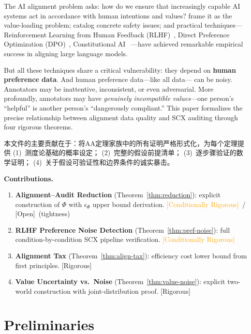 \documentclass[12pt,a4paper]{article}
\newcommand{\rigorous}{\textcolor{green!50!black}{\small\textsf{[Rigorous]}}}
\newcommand{\conditionallyrigorous}{\textcolor{orange}{\small\textsf{[Conditionally Rigorous]}}}
\newcommand{\openquest}{\textcolor{red!70!black}{\small\textsf{[Open]}}}
\begin{document}
The AI alignment problem asks: how do we ensure that increasingly capable AI
systems act in accordance with human intentions and values?
\citet{russell2019human} frame it as the value-loading problem;
\citet{amodei2016concrete} catalog concrete safety issues; and practical
techniques---Reinforcement Learning from Human Feedback
(RLHF)~\citep{christiano2017deep}, Direct Preference Optimization
(DPO)~\citep{rafailov2024direct}, Constitutional AI~\citep{bai2022constitutional}
---have achieved remarkable empirical success in aligning large language models.

But all these techniques share a critical vulnerability: they depend on
\textbf{human preference data}.  And human preference data---like all data---
can be noisy.  Annotators may be inattentive, inconsistent, or even
adversarial.  More profoundly, annotators may have \emph{genuinely
incompatible values}---one person's ``helpful'' is another person's
``dangerously compliant.''  This paper formalizes the precise relationship
between alignment data quality and SCX auditing through four rigorous theorems.

本文件的主要贡献在于：将AA定理家族中的所有证明严格形式化，为每个定理提供
(1)~测度论基础的概率设定； (2)~完整的假设前提清单；
(3)~逐步骤验证的数学证明； (4)~关于假设可验证性和边界条件的诚实暴击。

\medskip\noindent
\textbf{Contributions.}
\begin{enumerate}[label=(\arabic*)]
    \item \textbf{Alignment--Audit Reduction} (Theorem~\ref{thm:reduction}):
          explicit construction of $\Phi$ with $\epsilon_\Phi$ upper bound
          derivation. \conditionallyrigorous \ / \openquest~(tightness)
    \item \textbf{RLHF Preference Noise Detection} (Theorem~\ref{thm:pref-noise}):
          full condition-by-condition SCX pipeline verification. \conditionallyrigorous
    \item \textbf{Alignment Tax} (Theorem~\ref{thm:align-tax}):
          efficiency cost lower bound from first principles. \rigorous
    \item \textbf{Value Uncertainty vs.\ Noise} (Theorem~\ref{thm:value-noise}):
          explicit two-world construction with joint-distribution proof.
          \rigorous
\end{enumerate}

\section{Preliminaries}
\end{document}
